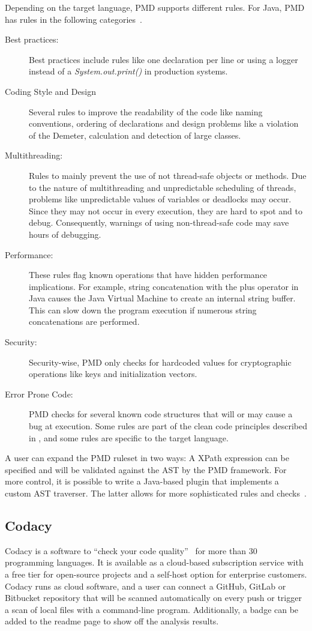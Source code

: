 Depending on the target language, PMD supports different rules. For Java, PMD has rules in the following categories~\cite{noauthor_documentation_nodate}.
\begin{description}
    \item[Best practices:] Best practices include rules like one declaration per line or using a logger instead of a \textit{System.out.print()} in production systems.  
    \item[Coding Style and Design] Several rules to improve the readability of the code like naming conventions, ordering of declarations and design problems like a violation of the Demeter,  calculation and detection of large classes.
    \item[Multithreading:]  Rules to mainly prevent the use of not thread-safe objects or methods. Due to the nature of multithreading and unpredictable scheduling of threads, problems like unpredictable values of variables or deadlocks may occur. Since they may not occur in every execution, they are hard to spot and to debug. Consequently, warnings of using non-thread-safe code may save hours of debugging.
    \item[Performance:] These rules flag known operations that have hidden performance implications. For example, string concatenation with the plus operator in Java causes the Java Virtual Machine to create an internal string buffer. This can slow down the program execution if numerous string concatenations are performed.
    \item[Security:] Security-wise, PMD only checks for hardcoded values for cryptographic operations like keys and initialization vectors.
    \item[Error Prone Code:] PMD checks for several known code structures that will or may cause a bug at execution. Some rules are part of the clean code principles described in , and some rules are specific to the target language.
\end{description}

A user can expand the PMD ruleset in two ways: A XPath expression can be specified and will be validated against the AST by the PMD framework. For more control, it is possible to write a Java-based plugin that implements a custom AST traverser. The latter allows for more sophisticated rules and checks~\cite{noauthor_documentation_nodate}.

\subsection{Codacy}
Codacy is a software to \enquote{check your code quality}~\cite{noauthor_codacy_nodate} for more than 30 programming languages. It is available as a cloud-based subscription service with a free tier for open-source projects and a self-host option for enterprise customers.  Codacy runs as cloud software, and a user can connect a GitHub, GitLab or Bitbucket repository that will be scanned automatically on every push or trigger a scan of local files with a command-line program. Additionally, a badge can be added to the readme page to show off the analysis results.

